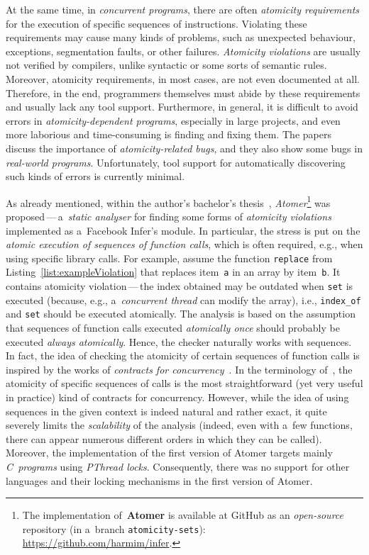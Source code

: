 At the same time, in \emph{concurrent programs}, there are often \emph{atomicity requirements} for the execution of specific sequences of instructions. Violating these requirements may cause many kinds of problems, such as unexpected behaviour, exceptions, segmentation faults, or other failures. \emph{Atomicity violations} are usually not verified by compilers, unlike syntactic or some sorts of semantic rules. Moreover, atomicity requirements, in most cases, are not even documented at all. Therefore, in the end, programmers themselves must abide by these requirements and usually lack any tool support. Furthermore, in general, it is difficult to avoid errors in \emph{atomicity-dependent programs}, especially in large projects, and even more laborious and time-consuming is finding and fixing them. The papers~\cite{contracts2017, atomizer, contracts2015, atomicityOOP} discuss the importance of \emph{atomicity-related bugs}, and they also show some bugs in \emph{real-world programs}. Unfortunately, tool support for automatically discovering such kinds of errors is currently minimal.

As already mentioned, within the author's bachelor's thesis~\cite{harmimBP}, \emph{Atomer}\footnote{The implementation of~\textbf{Atomer} is available at GitHub as an \emph{open-source} repository (in a~branch \texttt{atomicity-sets}): \url{https://github.com/harmim/infer}.} was proposed\,---\,a~\emph{static analyser} for finding some forms of \emph{atomicity violations} implemented as a~Facebook Infer's module. In particular, the stress is put on the \emph{atomic execution of sequences of function calls}, which is often required, e.g., when using specific library calls. For example, assume the function \texttt{replace} from Listing~\ref{list:exampleViolation} that replaces item~\texttt{a} in an array by item~\texttt{b}. It contains atomicity violation\,---\,the index obtained may be outdated when \texttt{set} is executed (because, e.g., a~\emph{concurrent thread} can modify the array), i.e., \texttt{index\_of} and \texttt{set} should be executed atomically. The analysis is based on the assumption that sequences of function calls executed \emph{atomically once} should probably be executed \emph{always atomically}. Hence, the checker naturally works with sequences. In fact, the idea of checking the atomicity of certain sequences of function calls is inspired by the works of \emph{contracts for concurrency}~\cite{contracts2017, contracts2015}. In the terminology of~\cite{contracts2017, contracts2015}, the atomicity of specific sequences of calls is the most straightforward (yet very useful in practice) kind of contracts for concurrency. However, while the idea of using sequences in the given context is indeed natural and rather exact, it quite severely limits the \emph{scalability} of the analysis (indeed, even with a~few functions, there can appear numerous different orders in which they can be called). Moreover, the implementation of the first version of Atomer targets mainly \emph{C~programs} using \emph{PThread locks}. Consequently, there was no support for other languages and their locking mechanisms in the first version of Atomer.

